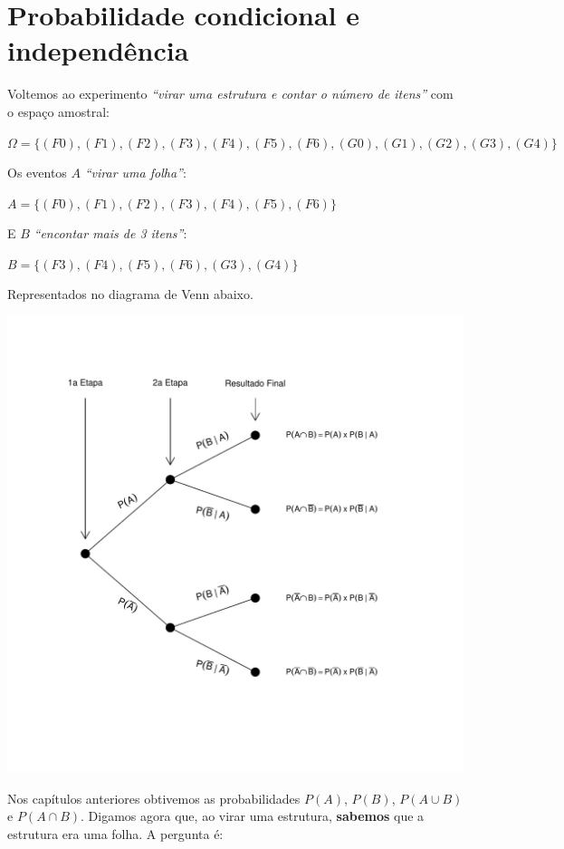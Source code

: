 \documentclass[
]{book}
\begin{document}
\hypertarget{probcondind}{%
\chapter{Probabilidade condicional e independência}\label{probcondind}}

Voltemos ao experimento \emph{``virar uma estrutura e contar o número de itens''} com o espaço amostral:

\(\Omega = \{(F0), (F1), (F2), (F3), (F4), (F5), (F6), (G0), (G1), (G2), (G3), (G4)\}\)

Os eventos \(A\) \emph{``virar uma folha''}:

\(A = \{(F0), (F1), (F2), (F3), (F4), (F5), (F6)\}\)

E \(B\) \emph{``encontar mais de 3 itens''}:

\(B = \{(F3), (F4), (F5), (F6), (G3), (G4)\}\)

Representados no diagrama de Venn abaixo.

\begin{center}\includegraphics{probest-cambientais_files/figure-latex/unnamed-chunk-191-1} \end{center}

Nos capítulos anteriores obtivemos as probabilidades \(P(A)\), \(P(B)\), \(P(A \cup B)\) e \(P(A \cap B)\). Digamos agora que, ao virar uma estrutura, \textbf{sabemos} que a estrutura era uma folha. A pergunta é:
\end{document}
